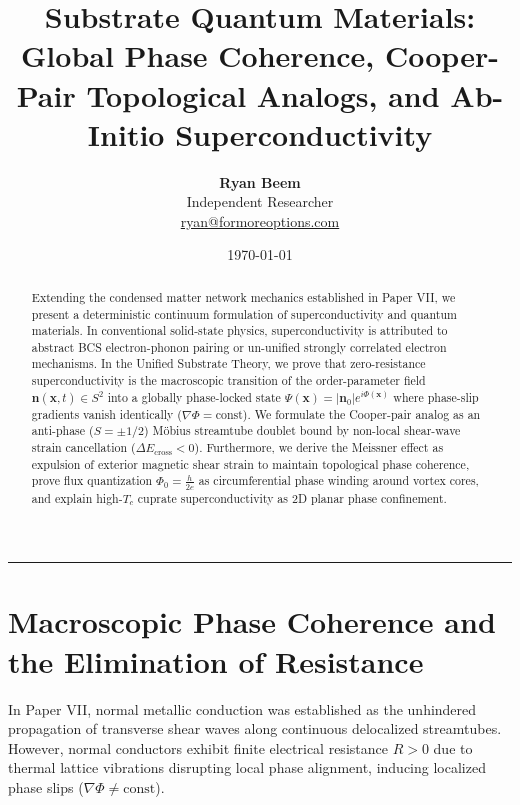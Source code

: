 \documentclass[11pt,a4paper]{article}
\title{\Large\bfseries Substrate Quantum Materials: Global Phase Coherence, Cooper-Pair Topological Analogs, and Ab-Initio Superconductivity}
\author{
	\textbf{Ryan Beem}\\[0.5em]
	\small Independent Researcher \\
	\small \href{mailto:ryan@formoreoptions.com}{ryan@formoreoptions.com}
}
\date{\today}
\begin{document}
	
	\maketitle
	
	\begin{abstract}
		Extending the condensed matter network mechanics established in Paper VII, we present a deterministic continuum formulation of superconductivity and quantum materials. In conventional solid-state physics, superconductivity is attributed to abstract BCS electron-phonon pairing or un-unified strongly correlated electron mechanisms. In the Unified Substrate Theory, we prove that zero-resistance superconductivity is the macroscopic transition of the order-parameter field $\mathbf{n}(\mathbf{x}, t) \in S^2$ into a globally phase-locked state $\Psi(\mathbf{x}) = |\mathbf{n}_0| e^{i \Phi(\mathbf{x})}$ where phase-slip gradients vanish identically ($\nabla \Phi = \text{const}$). We formulate the Cooper-pair analog as an anti-phase ($S = \pm 1/2$) Möbius streamtube doublet bound by non-local shear-wave strain cancellation ($\Delta E_{\text{cross}} < 0$). Furthermore, we derive the Meissner effect as expulsion of exterior magnetic shear strain to maintain topological phase coherence, prove flux quantization $\Phi_0 = \frac{h}{2e}$ as circumferential phase winding around vortex cores, and explain high-$T_c$ cuprate superconductivity as 2D planar phase confinement.
	\end{abstract}
	
	\vspace{1em}
	\hrule
	\vspace{1.5em}
	
	\section{Macroscopic Phase Coherence and the Elimination of Resistance}
	\label{sec:phase_coherence_mechanics}
	
	In Paper VII, normal metallic conduction was established as the unhindered propagation of transverse shear waves along continuous delocalized streamtubes. However, normal conductors exhibit finite electrical resistance $R > 0$ due to thermal lattice vibrations disrupting local phase alignment, inducing localized phase slips ($\nabla \Phi \neq \text{const}$).
	
\end{document}
